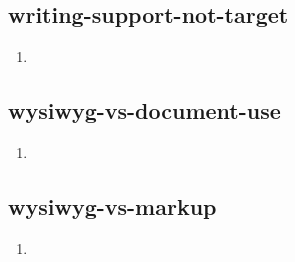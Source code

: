 \documentclass{article}
\begin{document}
\subsection{writing-support-not-target}
\begin{enumerate}
\item {}
\end{enumerate}

\subsection{wysiwyg-vs-document-use}
\begin{enumerate}
\item {}
\end{enumerate}

\subsection{wysiwyg-vs-markup}
\begin{enumerate}
\item {}
\end{enumerate}
\end{document}
